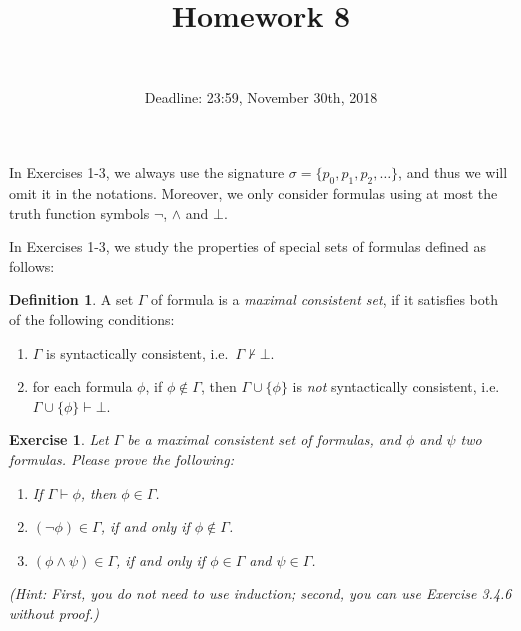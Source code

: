 \documentclass[12pt,a4paper]{article}
\title{Homework 8}
\author{\\
}
\date{Deadline: 23:59, November 30th, 2018}
\theoremstyle{plain}
\newtheorem{exercise}{Exercise}
\theoremstyle{definition}
\newtheorem{definition}{Definition}
\begin{document}
\maketitle



In Exercises 1-3, we always use the signature $\sigma = \{ p_0 , p_1 , p_2 , \dots \}$, and thus we will omit it in the notations.
Moreover, we only consider formulas using at most the truth function symbols $\neg$, $\wedge$ and $\bot$.

In Exercises 1-3, we study the properties of special sets of formulas defined as follows:

\begin{definition}
A set $\Gamma$ of formula is a \emph{maximal consistent set}, if it satisfies both of the following conditions: 
%
\begin{enumerate}

\item $\Gamma$ is syntactically consistent, i.e.\ $\Gamma \not \vdash \bot$.

\item for each formula $\phi$, if $\phi \not \in \Gamma$, then $\Gamma \cup \{ \phi \}$ is \emph{not} syntactically consistent, i.e.\ $\Gamma \cup \{ \phi \} \vdash \bot$.
\ \\ 

\end{enumerate}
\end{definition}


\begin{exercise}
Let $\Gamma$ be a maximal consistent set of formulas, and $\phi$ and $\psi$ two formulas.
Please prove the following:
%
\begin{enumerate}

\item If $\Gamma \vdash \phi$, then $\phi \in \Gamma$.

\item $( \neg \phi ) \in \Gamma$, if and only if $\phi \not \in \Gamma$.

\item $( \phi \wedge \psi ) \in \Gamma$, if and only if $\phi \in \Gamma$ and $\psi \in \Gamma$.

\end{enumerate}  
%
(Hint: First, you do not need to use induction; second, you can use Exercise 3.4.6 without proof.)
\end{exercise}
\end{document}
